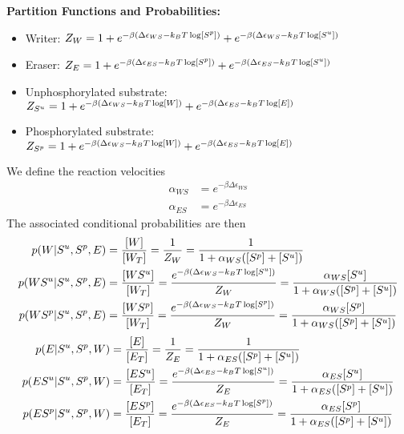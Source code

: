 \documentclass[aps,onecolumn,superscriptaddress,notitlepage]{revtex4-1}
\begin{document}
\textbf{Partition Functions and Probabilities:}
\begin{itemize}
\item Writer: $Z_W = 1 + e^{-\beta\qty(\Delta\epsilon_{WS} -k_BT \log[S^p])} + e^{-\beta\qty(\Delta\epsilon_{WS} -k_BT \log[S^u])}$
\item Eraser: $Z_E = 1 + e^{-\beta\qty(\Delta\epsilon_{ES} -k_BT \log[S^p])} + e^{-\beta\qty(\Delta\epsilon_{ES} -k_BT \log[S^u])}$
\item Unphosphorylated substrate: $Z_{S^u} = 1 + e^{-\beta\qty(\Delta\epsilon_{WS} -k_BT \log[W])} + e^{-\beta\qty(\Delta\epsilon_{ES} -k_BT \log[E])}$
\item Phosphorylated substrate: $Z_{S^p} = 1  + e^{-\beta\qty(\Delta\epsilon_{WS} -k_BT \log[W])} + e^{-\beta\qty(\Delta\epsilon_{ES} -k_BT \log[E])}$
\end{itemize}
We define the reaction velocities
\begin{align}
\alpha_{WS} &= e^{-\beta\Delta\epsilon_{WS}}\\
\alpha_{ES} &= e^{-\beta\Delta\epsilon_{ES}}
\end{align}
The associated conditional probabilities are then
\begin{align}
p(W|S^u,S^p, E) &= \frac{[W]}{[W_T]} = \frac{1}{Z_W} =  \frac{1}{1 + \alpha_{WS}([S^p]+[S^u])}\\
p(WS^u|S^u,S^p, E) &= \frac{[WS^u]}{[W_T]}  = \frac{e^{-\beta\qty(\Delta\epsilon_{WS} -k_BT \log[S^u])}}{Z_W} =  \frac{\alpha_{WS}[S^u]}{1 + \alpha_{WS}([S^p]+[S^u])}\\
p(WS^p|S^u,S^p, E) &= \frac{[WS^p]}{[W_T]}  = \frac{e^{-\beta\qty(\Delta\epsilon_{WS} -k_BT \log[S^p])}}{Z_W} =  \frac{\alpha_{WS}[S^p]}{1 + \alpha_{WS}([S^p]+[S^u])}
\end{align}
\begin{align}
p(E|S^u,S^p, W) &= \frac{[E]}{[E_T]} = \frac{1}{Z_E} =  \frac{1}{1 + \alpha_{ES}([S^p]+[S^u])}\\
p(ES^u|S^u,S^p, W) &= \frac{[ES^u]}{[E_T]}  = \frac{e^{-\beta\qty(\Delta\epsilon_{ES} -k_BT \log[S^u])}}{Z_E} =  \frac{\alpha_{ES}[S^u]}{1 + \alpha_{ES}([S^p]+[S^u])}\\
p(ES^p|S^u,S^p, W) &= \frac{[ES^p]}{[E_T]}  = \frac{e^{-\beta\qty(\Delta\epsilon_{ES} -k_BT \log[S^p])}}{Z_E} =  \frac{\alpha_{ES}[S^p]}{1 + \alpha_{ES}([S^p]+[S^u])}
\end{align}
\end{document}
